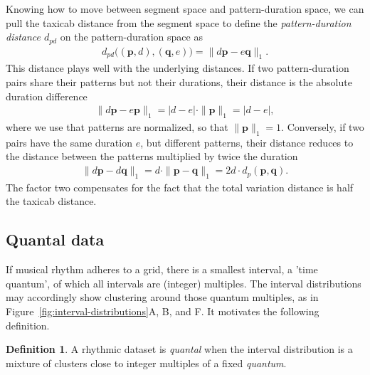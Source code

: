 \documentclass[suppldata]{tMAM2e}%
\newcommand{\vect}[1]{\mathbf{#1}}
\newcommand{\vp}{\vect p}
\newcommand{\vq}{\vect q}
\theoremstyle{plain}
\theoremstyle{definition}
\newtheorem{definition}[theorem]{Definition}
\theoremstyle{remark}
\begin{document}
Knowing how to move between segment space and pattern-duration space, we can pull the taxicab distance from the segment space to define the \emph{pattern-duration distance $d_{pd}$} on the pattern-duration space as
\begin{align}
  d_{pd}\Big((\vp, d), (\vq, e)\Big)
  = \|d\vp - e\vq\|_1.
\end{align}
This distance plays well with the underlying distances. 
If two pattern-duration pairs share their patterns but not their durations, their distance is the absolute duration difference
\begin{align}
  \|d\vp - e\vp\|_1
  = |d-e| \cdot \|\vp\|_1
  = |d-e|,
\end{align}
where we use that patterns are normalized, so that $\|\vp\|_1=1$.
Conversely, if two pairs have the same duration $e$, but different patterns, their distance reduces to the distance between the patterns multiplied by twice the duration
\begin{align}
  \|d \vp - d \vq\|_1
  = d \cdot \|\vp - \vq\|_1
  = 2d \cdot d_p(\vp, \vq).
\end{align}
The factor two compensates for the fact that the total variation distance is half the taxicab distance.


\subsection{Quantal data}

If musical rhythm adheres to a grid, there is a smallest interval, a 'time quantum', of which all intervals are (integer) multiples. 
The interval distributions may accordingly show clustering around those quantum multiples, as in Figure~\ref{fig:interval-distributions}A, B, and F. 
It motivates the following definition.

\begin{definition}
  A rhythmic dataset is \emph{quantal} when the interval distribution is a mixture of clusters close to integer multiples of a fixed \emph{quantum}.
\end{definition}
\end{document}
